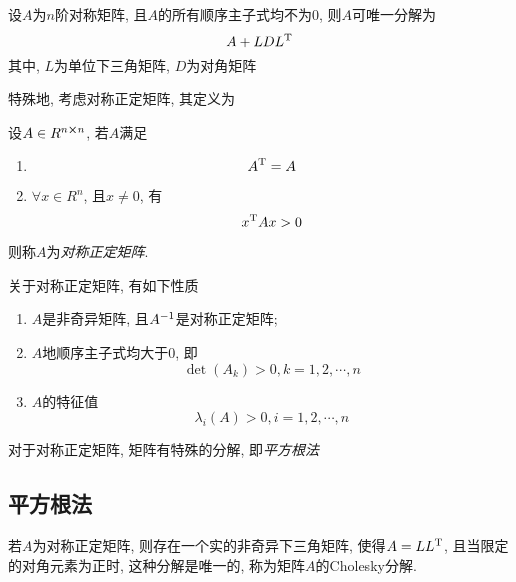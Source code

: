 \begin{corollary}
    设$A$为$n$阶对称矩阵, 且$A$的所有顺序主子式均不为0, 则$A$可唯一分解为
    \begin{equation*}
        A+LDL^\text{T}
    \end{equation*}
    其中, $L$为单位下三角矩阵, $D$为对角矩阵
\end{corollary}

特殊地, 考虑对称正定矩阵, 其定义为
\begin{definition}
    设$A\in R^{n\cross n}$, 若$A$满足
    \begin{enumerate}
        \item \begin{equation*}
            A^\text{T}=A
        \end{equation*}

        \item $\forall x\in R^n$, 且$x\ne 0$, 有
        \begin{equation*}
            x^\text{T}Ax>0
        \end{equation*}
    \end{enumerate}
    则称$A$为\emph{对称正定矩阵}.
\end{definition}

关于对称正定矩阵, 有如下性质
\begin{enumerate}
    \item $A$是非奇异矩阵, 且$A^{-1}$是对称正定矩阵;
    \item $A$地顺序主子式均大于0, 即
    \begin{equation*}
        \det(A_k)>0, k=1,2,\cdots,n
    \end{equation*}
    \item $A$的特征值
    \begin{equation*}
        \lambda_i(A)>0, i=1,2,\cdots,n
    \end{equation*}
\end{enumerate}

对于对称正定矩阵, 矩阵有特殊的分解, 即\emph{平方根法}

\subsection{平方根法}

\begin{theorem}
    若$A$为对称正定矩阵, 则存在一个实的非奇异下三角矩阵, 使得$A=LL^\text{T}$, 且当限定的对角元素为正时, 这种分解是唯一的, 称为矩阵$A$的Cholesky分解.
\end{theorem}

